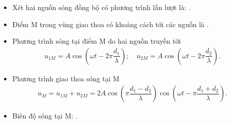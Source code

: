 \begin{itemize}
\item Xét hai nguồn sóng đồng bộ có phương trình lần lượt là: .
\item Điểm M trong vùng giao thoa có khoảng cách tới các nguồn là .
\item Phương trình sóng tại điểm M do hai nguồn truyền tới
\begin{align*}
u_{1M}=A\cos(\omega t-2\pi\dfrac{d_1}{\lambda});\quad u_{2M}=A\cos(\omega t-2\pi\dfrac{d_2}{\lambda}).
\end{align*}
\item Phương trình giao thoa sóng tại M
\begin{align*}
u_M=u_{1M}+u_{2M}=2A\cos(\pi\dfrac{d_1-d_2}{\lambda})\cos(\omega t-\pi\dfrac{d_1+d_2}{\lambda}).
\end{align*}
\item Biên độ sóng tại M: .
\end{itemize}
